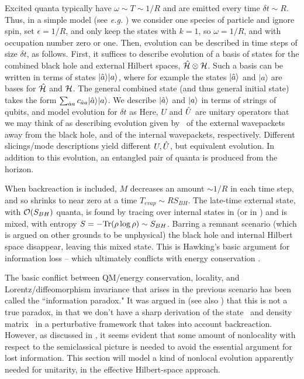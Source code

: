 Excited quanta typically have $\omega\sim T\sim 1/R$ and are emitted every time $\delta t\sim R$.  Thus, in a simple model (see {\it e.g.} \Mathurrev) we consider one species of particle and ignore spin, set $\epsilon=1/R$, and only keep the states with $k=1$, so $\omega=1/R$, and with occupation number zero or one.  Then, evolution can be described in time steps of size $\delta t$, as follows.  First, it suffices to describe evolution of a basis of states for the combined black hole and external Hilbert spaces, ${\hat{\cal H}}\otimes{\cal H}$.  Such a basis can be written in terms of states $|{\hat a}\rangle|a\rangle$, where for example the states $|{\hat a}\rangle$ and $|a\rangle$ are bases for ${\hat{\cal H}}$ and ${\cal H}$.   The general combined state (and thus general initial state) takes the form $\sum_{{\hat a} a} c_{{\hat a} a} |{\hat a}\rangle|a\rangle$.  We describe $|{\hat a}\rangle$ and $|a\rangle$ in terms of strings of qubits, and model evolution for $\delta t$ as
%
\eqn{}
%
Here, $U$ and ${\hat U}$ are unitary operators that we may think of as describing evolution given by \hamil\ of the external wavepackets away from the black hole, and of the internal wavepackets, respectively.  Different slicings/mode descriptions yield different $U,{\hat U}$, but equivalent evolution.  In addition to this evolution, an entangled pair of quanta is produced from the horizon.

When backreaction is included, $M$ decreases an amount $\sim 1/R$ in each time step, and so shrinks to near zero at a time $T_{evap}\sim RS_{BH}$.  The late-time external state, with ${\cal O}(S_{BH})$ quanta, is found by tracing over internal states in \paircreate (or in \hawkstate)
%
\eqn{}
%
and  is mixed, with entropy $S=-{\rm Tr}(\rho\log\rho) \sim S_{BH}$. Barring a remnant scenario (which is argued on other grounds  to be unphysical) the black hole and internal Hilbert space disappear, leaving this mixed state.  This is Hawking's basic argument  for information loss -- which ultimately conflicts with energy conservation .



The basic conflict between QM/energy conservation, locality, and Lorentz/diffe\-omorph\-ism invariance that arises in the previous scenario has been called the ``information paradox."  It was argued in   (see also  ) that this is not a true paradox, in that we don't have a sharp derivation of the state \hawkstate\ and density matrix \rhoout\ in a perturbative framework that takes into account backreaction.  However, as discussed in  , it seems evident that some amount of nonlocality with respect to the semiclassical picture is needed to avoid the essential argument for lost information.  This section will model a kind of nonlocal evolution apparently needed for unitarity, in the effective Hilbert-space approach.

